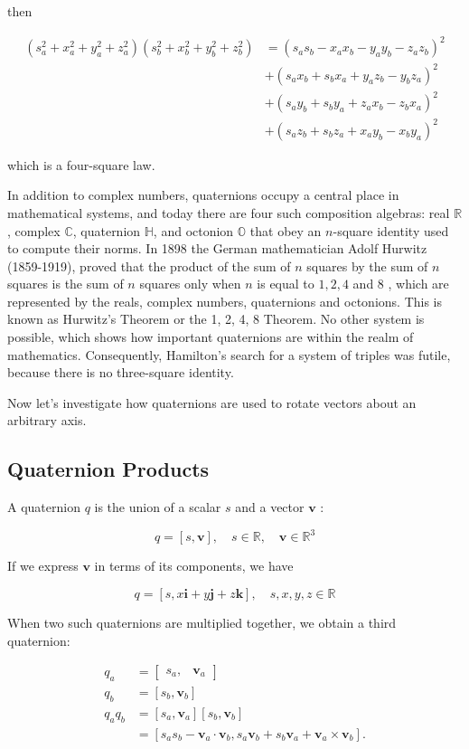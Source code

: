 \documentclass[10pt]{article}
\begin{document}
then

$$
\begin{aligned}
\left(s_{a}^{2}+x_{a}^{2}+y_{a}^{2}+z_{a}^{2}\right)\left(s_{b}^{2}+x_{b}^{2}+y_{b}^{2}+z_{b}^{2}\right) & =\left(s_{a} s_{b}-x_{a} x_{b}-y_{a} y_{b}-z_{a} z_{b}\right)^{2} \\
& +\left(s_{a} x_{b}+s_{b} x_{a}+y_{a} z_{b}-y_{b} z_{a}\right)^{2} \\
& +\left(s_{a} y_{b}+s_{b} y_{a}+z_{a} x_{b}-z_{b} x_{a}\right)^{2} \\
& +\left(s_{a} z_{b}+s_{b} z_{a}+x_{a} y_{b}-x_{b} y_{a}\right)^{2}
\end{aligned}
$$

which is a four-square law.

In addition to complex numbers, quaternions occupy a central place in mathematical systems, and today there are four such composition algebras: real $\mathbb{R}$, complex $\mathbb{C}$, quaternion $\mathbb{H}$, and octonion $\mathbb{O}$ that obey an $n$-square identity used to compute their norms. In 1898 the German mathematician Adolf Hurwitz (1859-1919), proved that the product of the sum of $n$ squares by the sum of $n$ squares is the sum of $n$ squares only when $n$ is equal to $1,2,4$ and 8 , which are represented by the reals, complex numbers, quaternions and octonions. This is known as Hurwitz's Theorem or the 1, 2, 4, 8 Theorem. No other system is possible, which shows how important quaternions are within the realm of mathematics. Consequently, Hamilton's search for a system of triples was futile, because there is no three-square identity.

Now let's investigate how quaternions are used to rotate vectors about an arbitrary axis.

\subsection{Quaternion Products}
A quaternion $q$ is the union of a scalar $s$ and a vector $\mathbf{v}$ :

$$
q=[s, \mathbf{v}], \quad s \in \mathbb{R}, \quad \mathbf{v} \in \mathbb{R}^{3}
$$

If we express $\mathbf{v}$ in terms of its components, we have

$$
q=[s, x \mathbf{i}+y \mathbf{j}+z \mathbf{k}], \quad s, x, y, z \in \mathbb{R}
$$

When two such quaternions are multiplied together, we obtain a third quaternion:

$$
\begin{aligned}
q_{a} & =\left[\begin{array}{ll}
s_{a}, & \mathbf{v}_{a}
\end{array}\right] \\
q_{b} & =\left[s_{b}, \mathbf{v}_{b}\right] \\
q_{a} q_{b} & =\left[s_{a}, \mathbf{v}_{a}\right]\left[s_{b}, \mathbf{v}_{b}\right] \\
& =\left[s_{a} s_{b}-\mathbf{v}_{a} \cdot \mathbf{v}_{b}, s_{a} \mathbf{v}_{b}+s_{b} \mathbf{v}_{a}+\mathbf{v}_{a} \times \mathbf{v}_{b}\right] .
\end{aligned}
$$
\end{document}
